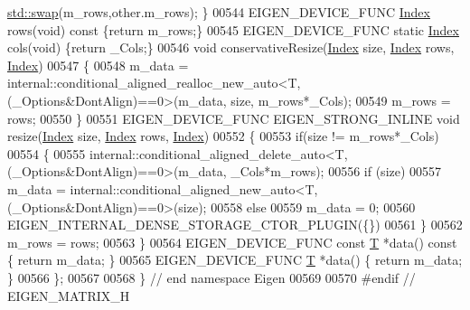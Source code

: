 \begin{DoxyCode}
      \hyperlink{endian_8c_a3ca5ecd34b04d6a243c054ac3a57f68d}{std::swap}(m\_rows,other.m\_rows); \}
00544     EIGEN\_DEVICE\_FUNC \hyperlink{namespace_eigen_a62e77e0933482dafde8fe197d9a2cfde}{Index} rows(\textcolor{keywordtype}{void})\textcolor{keyword}{ const }\{\textcolor{keywordflow}{return} m\_rows;\}
00545     EIGEN\_DEVICE\_FUNC \textcolor{keyword}{static} \hyperlink{namespace_eigen_a62e77e0933482dafde8fe197d9a2cfde}{Index} cols(\textcolor{keywordtype}{void}) \{\textcolor{keywordflow}{return} \_Cols;\}
00546     \textcolor{keywordtype}{void} conservativeResize(\hyperlink{namespace_eigen_a62e77e0933482dafde8fe197d9a2cfde}{Index} size, \hyperlink{namespace_eigen_a62e77e0933482dafde8fe197d9a2cfde}{Index} rows, \hyperlink{namespace_eigen_a62e77e0933482dafde8fe197d9a2cfde}{Index})
00547     \{
00548       m\_data = internal::conditional\_aligned\_realloc\_new\_auto<T,(\_Options&DontAlign)==0>(m\_data, size, 
      m\_rows*\_Cols);
00549       m\_rows = rows;
00550     \}
00551     EIGEN\_DEVICE\_FUNC EIGEN\_STRONG\_INLINE \textcolor{keywordtype}{void} resize(\hyperlink{namespace_eigen_a62e77e0933482dafde8fe197d9a2cfde}{Index} size, \hyperlink{namespace_eigen_a62e77e0933482dafde8fe197d9a2cfde}{Index} rows, 
      \hyperlink{namespace_eigen_a62e77e0933482dafde8fe197d9a2cfde}{Index})
00552     \{
00553       \textcolor{keywordflow}{if}(size != m\_rows*\_Cols)
00554       \{
00555         internal::conditional\_aligned\_delete\_auto<T,(\_Options&DontAlign)==0>(m\_data, \_Cols*m\_rows);
00556         \textcolor{keywordflow}{if} (size)
00557           m\_data = internal::conditional\_aligned\_new\_auto<T,(\_Options&DontAlign)==0>(size);
00558         \textcolor{keywordflow}{else}
00559           m\_data = 0;
00560         EIGEN\_INTERNAL\_DENSE\_STORAGE\_CTOR\_PLUGIN(\{\})
00561       \}
00562       m\_rows = rows;
00563     \}
00564     EIGEN\_DEVICE\_FUNC \textcolor{keyword}{const} \hyperlink{group___sparse_core___module}{T} *data()\textcolor{keyword}{ const }\{ \textcolor{keywordflow}{return} m\_data; \}
00565     EIGEN\_DEVICE\_FUNC \hyperlink{group___sparse_core___module}{T} *data() \{ \textcolor{keywordflow}{return} m\_data; \}
00566 \};
00567 
00568 \} \textcolor{comment}{// end namespace Eigen}
00569 
00570 \textcolor{preprocessor}{#endif // EIGEN\_MATRIX\_H}
\end{DoxyCode}
